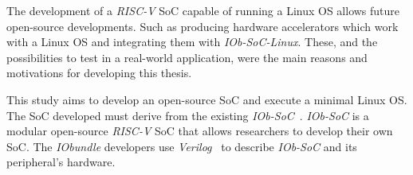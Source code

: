 The development of a \textit{RISC-V} SoC capable of running a Linux OS allows future open-source developments. Such as producing hardware accelerators which work with a Linux OS and integrating them with \textit{IOb-SoC-Linux}. These, and the possibilities to test in a real-world application, were the main reasons and motivations for developing this thesis.

This study aims to develop an open-source SoC and execute a minimal Linux OS. The SoC developed must derive from the existing \textit{IOb-SoC}~\cite{iob_soc}. \textit{IOb-SoC} is a modular open-source \textit{RISC-V} SoC that allows researchers to develop their own SoC. The \textit{IObundle} developers use \textit{Verilog}~\cite{thomas2008verilog} to describe \textit{IOb-SoC} and its peripheral's hardware.
